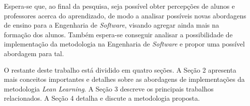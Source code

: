 

Espera-se que, ao final da pesquisa, seja possível obter percepções de alunos e professores acerca do aprendizado, de modo a analisar possíveis novas abordagens de ensino para a Engenharia de \textit{Software}, visando agregar ainda mais na formação dos alunos. Também espera-se conseguir analisar a possibilidade de implementação da metodologia na Engenharia de \textit{Software} e propor uma possível abordagem para tal. 

O restante deste trabalho está dividido em quatro seções. A Seção 2 apresenta mais conceitos importantes e detalhes sobre as abordagens de implementações da metodologia \textit{Lean Learning}. A Seção 3 descreve os principais trabalhos relacionados. A Seção 4 detalha e discute a metodologia proposta.